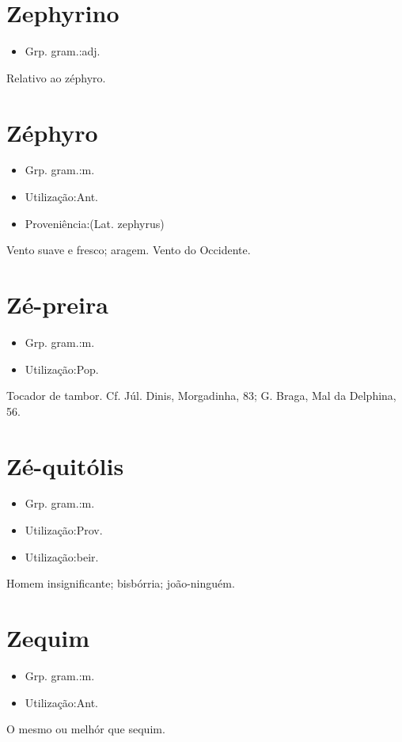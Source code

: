 \section{Zephyrino}
\begin{itemize}
\item {Grp. gram.:adj.}
\end{itemize}
Relativo ao zéphyro.
\section{Zéphyro}
\begin{itemize}
\item {Grp. gram.:m.}
\end{itemize}
\begin{itemize}
\item {Utilização:Ant.}
\end{itemize}
\begin{itemize}
\item {Proveniência:(Lat. \textunderscore zephyrus\textunderscore )}
\end{itemize}
Vento suave e fresco; aragem.
Vento do Occidente.
\section{Zé-preira}
\begin{itemize}
\item {Grp. gram.:m.}
\end{itemize}
\begin{itemize}
\item {Utilização:Pop.}
\end{itemize}
Tocador de tambor. Cf. Júl. Dinis, \textunderscore Morgadinha\textunderscore , 83; G. Braga, \textunderscore Mal da Delphina\textunderscore , 56.
\section{Zé-quitólis}
\begin{itemize}
\item {Grp. gram.:m.}
\end{itemize}
\begin{itemize}
\item {Utilização:Prov.}
\end{itemize}
\begin{itemize}
\item {Utilização:beir.}
\end{itemize}
Homem insignificante; bisbórria; joão-ninguém.
\section{Zequim}
\begin{itemize}
\item {Grp. gram.:m.}
\end{itemize}
\begin{itemize}
\item {Utilização:Ant.}
\end{itemize}
O mesmo ou melhór que \textunderscore sequim\textunderscore .
